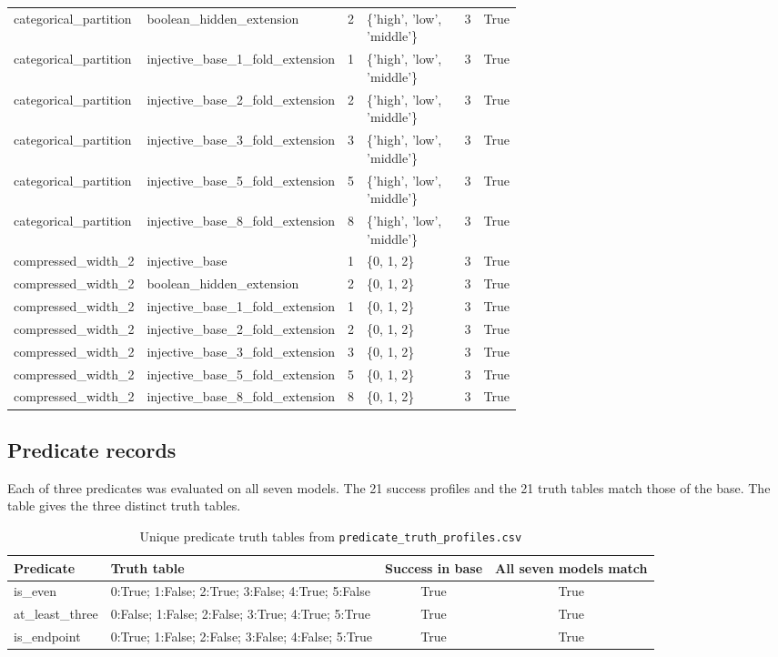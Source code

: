 \begin{landscape}
\begin{longtable}{@{}p{0.13\linewidth}p{0.27\linewidth}rp{0.25\linewidth}rc@{}}
categorical\_partition & boolean\_hidden\_extension & 2 & \{'high', 'low', 'middle'\} & 3 & True \\
categorical\_partition & injective\_base\_1\_fold\_extension & 1 & \{'high', 'low', 'middle'\} & 3 & True \\
categorical\_partition & injective\_base\_2\_fold\_extension & 2 & \{'high', 'low', 'middle'\} & 3 & True \\
categorical\_partition & injective\_base\_3\_fold\_extension & 3 & \{'high', 'low', 'middle'\} & 3 & True \\
categorical\_partition & injective\_base\_5\_fold\_extension & 5 & \{'high', 'low', 'middle'\} & 3 & True \\
categorical\_partition & injective\_base\_8\_fold\_extension & 8 & \{'high', 'low', 'middle'\} & 3 & True \\
compressed\_width\_2 & injective\_base & 1 & \{0, 1, 2\} & 3 & True \\
compressed\_width\_2 & boolean\_hidden\_extension & 2 & \{0, 1, 2\} & 3 & True \\
compressed\_width\_2 & injective\_base\_1\_fold\_extension & 1 & \{0, 1, 2\} & 3 & True \\
compressed\_width\_2 & injective\_base\_2\_fold\_extension & 2 & \{0, 1, 2\} & 3 & True \\
compressed\_width\_2 & injective\_base\_3\_fold\_extension & 3 & \{0, 1, 2\} & 3 & True \\
compressed\_width\_2 & injective\_base\_5\_fold\_extension & 5 & \{0, 1, 2\} & 3 & True \\
compressed\_width\_2 & injective\_base\_8\_fold\_extension & 8 & \{0, 1, 2\} & 3 & True \\
\bottomrule
\end{longtable}

\end{landscape}

\subsection{Predicate records}
Each of three predicates was evaluated on all seven models. The 21 success profiles and the 21 truth tables match those of the base. The table gives the three distinct truth tables.
\begin{table}[H]
\centering
\caption{Unique predicate truth tables from \texttt{predicate\_truth\_profiles.csv}}
\begin{tabularx}{\textwidth}{@{}lXcc@{}}
\toprule
Predicate & Truth table & Success in base & All seven models match \\
\midrule
is\_even & 0:True; 1:False; 2:True; 3:False; 4:True; 5:False & True & True \\
at\_least\_three & 0:False; 1:False; 2:False; 3:True; 4:True; 5:True & True & True \\
is\_endpoint & 0:True; 1:False; 2:False; 3:False; 4:False; 5:True & True & True \\
\bottomrule
\end{tabularx}
\end{table}

